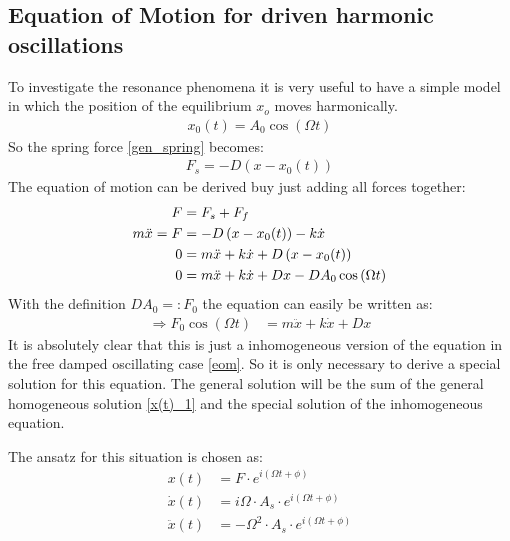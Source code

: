 \subsection{Equation of Motion for driven harmonic oscillations}
To investigate the resonance phenomena it is very useful to have a simple model in which the position of the equilibrium \(x_o\) moves harmonically.
\begin{align}
x_0(t) = A_0\cos \left( \Omega t\right)
\end{align}
So the spring force \eqref{gen_spring} becomes:
\begin{align}
F_s = -D\left(x -x_0(t) \right)
\end{align}
The equation of motion can be derived buy just adding all forces together:
\begin{align}
F &= F_s + F_f \notag\\
m \ddot{x} = F &= -D\left(x -x_0(t) \right) -k \dot{x} \notag \\
0 &= m \ddot{x}  + k \dot{x} + D\left(x -x_0(t) \right) \notag \\
0 &= m \ddot{x}  + k \dot{x} + Dx -DA_0\cos \left( \Omega t\right) \notag
\end{align}
With the definition \(DA_0 =: F_0\) the equation can easily be written as:
\begin{align}
\Rightarrow F_0 \cos \left( \Omega t \right) &= m \ddot{x} + k \dot{x} + Dx
\end{align}
It is absolutely clear that this is just a inhomogeneous version of the equation in the free damped oscillating case \eqref{eom}. So it is only necessary to derive a special solution for this equation. The general solution will be the sum of the general homogeneous solution \eqref{x(t)_1} and the special solution of the inhomogeneous equation.

The ansatz for this situation is chosen as:
\begin{align}
x(t) &= F \cdot e^{i(\Omega t + \phi)} \\
\dot{x}(t) &= i \Omega \cdot A_s \cdot e^{i(\Omega t + \phi)} \\
\ddot{x}(t) &= - \Omega^2 \cdot A_s \cdot e^{i(\Omega t + \phi)} \\
\end{align}